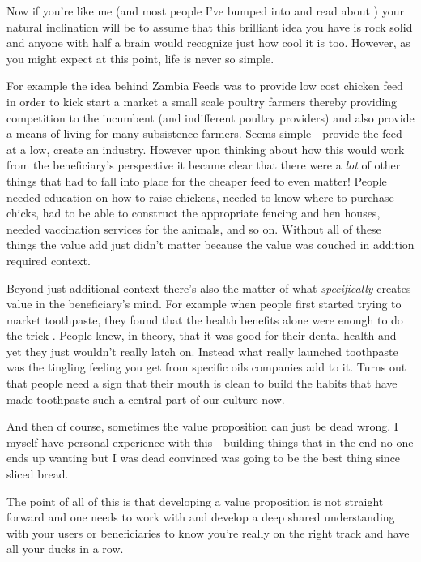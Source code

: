 \documentclass[11pt,a5paper]{book}
\begin{document}
Now if you're like me (and most people I've bumped into and read about \cite{patton}) your natural inclination will be to assume that this brilliant idea you have is rock solid and anyone with half a brain would recognize just how cool it is too. However, as you might expect at this point, life is never so simple. 
\newline

For example the idea behind Zambia Feeds \cite{macmillan} was to provide low cost chicken feed in order to kick start a market a small scale poultry farmers thereby providing competition to the incumbent (and indifferent poultry providers) and also provide a means of living for many subsistence farmers. Seems simple - provide the feed at a low, create an industry. However upon thinking about how this would work from the beneficiary's perspective it became clear that there were a \textit{lot} of other things that had to fall into place for the cheaper feed to even matter! People needed education on how to raise chickens, needed to know where to purchase chicks, had to be able to construct the appropriate fencing and hen houses, needed vaccination services for the animals, and so on. Without all of these things the value add just didn't matter because the value was couched in addition required context. 
\newline

Beyond just additional context there's also the matter of what \textit{specifically} creates value in the beneficiary's mind. For example when people first started trying to market toothpaste, they found that the health benefits alone were enough to do the trick \cite{duhigg}. People knew, in theory, that it was good for their dental health and yet they just wouldn't really latch on. Instead what really launched toothpaste was the tingling feeling you get from specific oils companies add to it. Turns out that people need a sign that their mouth is clean to build the habits that have made toothpaste such a central part of our culture now. 
\newline

And then of course, sometimes the value proposition can just be dead wrong. I myself have personal experience with this - building things that in the end no one ends up wanting but I was dead convinced was going to be the best thing since sliced bread.
\newline

The point of all of this is that developing a value proposition is not straight forward and one needs to work with and develop a deep shared understanding with your users or beneficiaries to know you're really on the right track and have all your ducks in a row.
\newline
\end{document}
